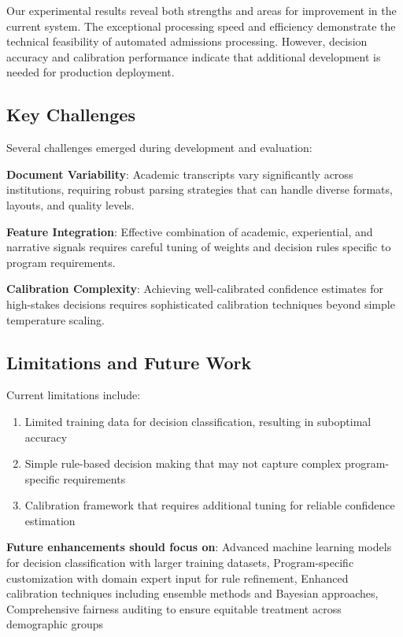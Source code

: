 \documentclass{article}
\begin{document}
Our experimental results reveal both strengths and areas for improvement in the current system. The exceptional processing speed and efficiency demonstrate the technical feasibility of automated admissions processing. However, decision accuracy and calibration performance indicate that additional development is needed for production deployment.

\subsection{Key Challenges}

Several challenges emerged during development and evaluation:

\textbf{Document Variability}: Academic transcripts vary significantly across institutions, requiring robust parsing strategies that can handle diverse formats, layouts, and quality levels.

\textbf{Feature Integration}: Effective combination of academic, experiential, and narrative signals requires careful tuning of weights and decision rules specific to program requirements.

\textbf{Calibration Complexity}: Achieving well-calibrated confidence estimates for high-stakes decisions requires sophisticated calibration techniques beyond simple temperature scaling.

\subsection{Limitations and Future Work}

Current limitations include:
\begin{enumerate}
    \item Limited training data for decision classification, resulting in suboptimal accuracy
    \item Simple rule-based decision making that may not capture complex program-specific requirements
    \item Calibration framework that requires additional tuning for reliable confidence estimation
\end{enumerate}

\textbf{Future enhancements should focus on}: Advanced machine learning models for decision classification with larger training datasets, Program-specific customization with domain expert input for rule refinement, Enhanced calibration techniques including ensemble methods and Bayesian approaches, Comprehensive fairness auditing to ensure equitable treatment across demographic groups
\end{document}
